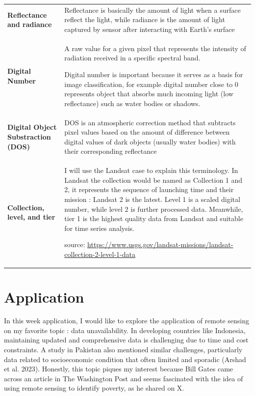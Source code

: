 \documentclass[
  letterpaper,
  DIV=11,
  numbers=noendperiod]{scrreprt}
\begin{document}
\begin{longtable}[]{@{}
  >{\raggedright\arraybackslash}p{}
  >{\raggedright\arraybackslash}p{}@{}}
\toprule\noalign{}
\endhead
\bottomrule\noalign{}
\endlastfoot
\textbf{Reflectance and radiance} & Reflectance is basically the amount
of light when a surface reflect the light, while radiance is the amount
of light captured by sensor after interacting with Earth's surface \\
\textbf{Digital Number} & A raw value for a given pixel that represents
the intensity of radiation received in a specific spectral band.

Digital number is important because it serves as a basis for image
classification, for example digital number close to 0 represents object
that absorbs much incoming light (low reflectance) such as water bodies
or shadows. \\
\textbf{Digital Object Substraction (DOS)} & DOS is an atmospheric
correction method that subtracts pixel values based on the amount of
difference between digital values of dark objects (usually water bodies)
with their corresponding reflectance \\
\textbf{Collection, level, and tier} & I will use the Landsat case to
explain this terminology. In Landsat the collection would be named as
Collection 1 and 2, it represents the sequence of launching time and
their mission : Landsat 2 is the latest. Level 1 is a scaled digital
number, while level 2 is further processed data. Meanwhile, tier 1 is
the highest quality data from Landsat and suitable for time series
analysis.

source:
\url{https://www.usgs.gov/landsat-missions/landsat-collection-2-level-1-data} \\
\end{longtable}

\hypertarget{application-1}{%
\section{Application}\label{application-1}}

In this week application, I would like to explore the application of
remote sensing on my favorite topic : data unavailability. In developing
countries like Indonesia, maintaining updated and comprehensive data is
challenging due to time and cost constraints. A study in Pakistan also
mentioned similar challenges, particularly data related to socioeconomic
condition that often limited and sporadic (Arshad et al. 2023).
Honestly, this topic piques my interest because Bill Gates came across
an article in The Washington Post and seems fascinated with the idea of
using remote sensing to identify poverty, as he shared on X.
\end{document}
